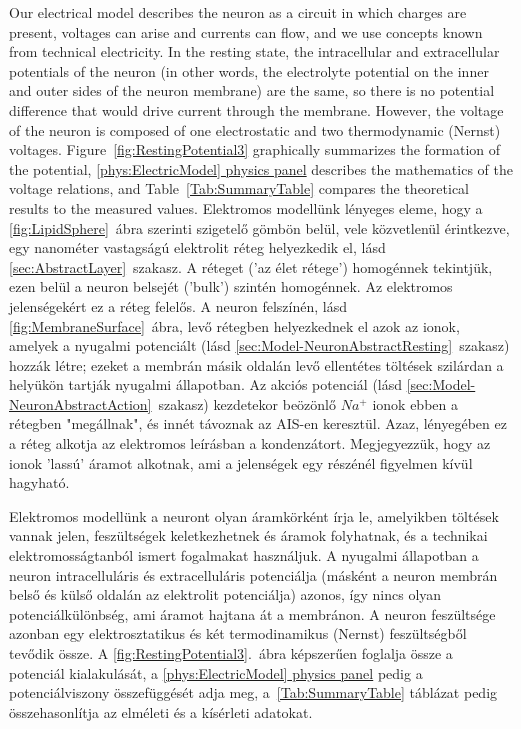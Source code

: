 Our electrical model describes the neuron as a circuit in which charges are present, voltages can arise and currents can flow, and we use concepts known from technical electricity. In the resting state, the intracellular and extracellular potentials of the neuron (in other words, the electrolyte potential on the inner and outer sides of the neuron membrane) are the same, so there is no potential difference that would drive current through the membrane. However, the voltage of the neuron is composed of one electrostatic and two thermodynamic (Nernst) voltages. Figure~\ref{fig:RestingPotential3} graphically summarizes the formation of the potential,
{\hyperlink{phys:ElectricModel}{\ref{phys:ElectricModel} physics panel}}
describes the mathematics of the voltage relations, and Table~\ref{Tab:SummaryTable} compares the theoretical 
results to the measured values.
%
\else
%
Elektromos modellünk lényeges eleme, hogy a \ref{fig:LipidSphere}~ábra szerinti szigetelő gömbön belül, vele közvetlenül érintkezve, egy nanométer vastagságú elektrolit réteg helyezkedik el, lásd \ref{sec:AbstractLayer}~szakasz. A réteget ('az élet rétege') homogénnek tekintjük,  ezen belül a neuron belsejét ('bulk') szintén homogénnek. Az elektromos jelenségekért ez a réteg felelős. A neuron felszínén, lásd \ref{fig:MembraneSurface}~ábra, levő rétegben helyezkednek el azok az ionok, amelyek a nyugalmi potenciált (lásd \ref{sec:Model-NeuronAbstractResting}~szakasz)  hozzák létre; ezeket a membrán másik oldalán levő ellentétes töltések szilárdan a helyükön tartják nyugalmi állapotban. Az akciós potenciál (lásd \ref{sec:Model-NeuronAbstractAction}~szakasz) kezdetekor beözönlő $Na^+$ ionok ebben a rétegben "megállnak", és innét távoznak az \gls{AIS}-en keresztül.  Azaz, lényegében ez a réteg alkotja az elektromos leírásban a kondenzátort. Megjegyezzük, hogy az ionok 'lassú' áramot alkotnak, ami a jelenségek egy részénél figyelmen kívül hagyható.

Elektromos modellünk a neuront olyan áramkörként írja le, amelyikben töltések vannak jelen, feszültségek 
keletkezhetnek és áramok folyhatnak, és
a technikai elektromosságtanból ismert fogalmakat használjuk.
A nyugalmi állapotban 
a neuron intracelluláris és extracelluláris potenciálja 
(másként a neuron membrán belső és külső oldalán az
elektrolit potenciálja) azonos,
így nincs olyan potenciálkülönbség, ami áramot hajtana át a membránon. 
A neuron feszültsége azonban egy elektrosztatikus és két termodinamikus (Nernst) feszültségből tevődik össze.
A \ref{fig:RestingPotential3}.~ábra képszerűen foglalja össze
a potenciál kialakulását, a
{\hyperlink{phys:ElectricModel}{\ref{phys:ElectricModel} physics panel}} 
pedig a potenciálviszony összefüggését adja meg,
a~\ref{Tab:SummaryTable} táblázat pedig összehasonlítja az elméleti és a kísérleti adatokat.
\fi


